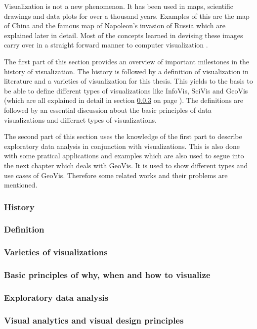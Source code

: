 Visualization is not a new phenomenon. It has been used in maps, scientific drawings and data plots for over a thousand years. Examples of this are the map of China and the famous map of Napoleon's invasion of Russia which are explained later in detail. Most of the concepts learned in devising these images carry over in a straight forward manner to computer visualization .

The first part of this section provides an overview of important milestones in the history of visualization. The history is followed by a definition of visualization in literature and a varieties of visualization for this thesis. This yields to the basis to be able to define different types of visualizations like \ac{InfoVis}, \ac{SciVis} and \ac{GeoVis} (which are all explained in detail in section \ref{s:definitions-types} on page \pageref{s:definitions-types}). The definitions are followed by an essential discussion about the basic principles of data visualizations and differnet types of visualizations.

The second part of this section uses the knowledge of the first part to describe exploratory data analysis in conjunction with visualizations. This is also done with some pratical applications and examples which are also used to segue into the next chapter which deals with \ac{GeoVis}. It is used to show different types and use cases of \ac{GeoVis}. Therefore some related works and their problems are mentioned.

\subsubsection{History}
\label{s:history}


\subsubsection{Definition}
\label{s:definition}


\subsubsection{Varieties of visualizations}
\label{s:definitions-types}


\subsubsection{Basic principles of why, when and how to visualize}
\label{s:basics}


\subsubsection{Exploratory data analysis}
\label{s:eda}


\subsubsection{Visual analytics and visual design principles}
\label{s:va}

